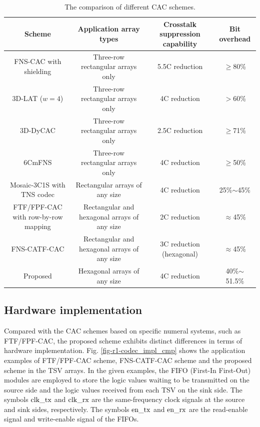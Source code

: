 \documentclass[lettersize,journal]{IEEEtran}
\begin{document}
\begin{table}
	\renewcommand{\arraystretch}{1.1}
	\caption{The comparison of different CAC schemes.}
	\label{table-6.2.1}
	\centering
	
	\begin{tabular}{|c|c|c|c|}
		\hline
		{\bf Scheme} & {\bf Application array types} & {\bf Crosstalk suppression capability} & {\bf Bit overhead} \\
		\hline
		FNS-CAC with shielding\cite{A20_Ran_7588317}
 & Three-row rectangular arrays only & 5.5C reduction & $\geq$80\% \\
		\hline
		3D-LAT ($w=4$) \cite{A19_Zou_6742982}
 & Three-row rectangular arrays only & 4C reduction & $>$60\% \\
		\hline
		3D-DyCAC \cite{A30_Shirmohammadi_8167468} & Three-row rectangular arrays only & 2.5C reduction & $\geq$71\% \\
		\hline
		6CmFNS \cite{A10_Cui_7851080}
 & Three-row rectangular arrays only & 4C reduction & $\geq$50\% \\
		\hline
		Mosaic-3C1S with TNS codec \cite{A11_Cui_9509749}
 & Rectangular arrays of any size & 4C reduction & 25\%$\sim$45\% \\
		\hline
		FTF/FPF-CAC with row-by-row mapping \cite{A31_Duan_4773140,A32_Duan_4555963}
 & Rectangular and hexagonal arrays of any size & 2C reduction & $\approx$45\% \\
 	    \hline
 FNS-CATF-CAC \cite{FNSCATF_10945736}
 & Rectangular and hexagonal arrays of any size & 3C reduction (hexagonal) & $\approx$45\% \\
		\hline
		Proposed & Hexagonal arrays of any size & 4C reduction & 40\%$\sim$51.5\% \\
		\hline
	\end{tabular}
	
\end{table}

\subsection{Hardware implementation}\label{subsec-simu-hardware}
Compared with the CAC schemes based on specific numeral systems, such as FTF/FPF-CAC, the proposed scheme exhibits distinct differences in terms of hardware implementation. Fig. \ref{fig-r1-codec_impl_cmp} shows the application examples of FTF/FPF-CAC scheme, FNS-CATF-CAC scheme and the proposed scheme in the TSV arrays. In the given examples, the FIFO (First-In First-Out) modules are employed to store the logic values waiting to be transmitted on the source side and the logic values received from each TSV on the sink side. The symbols $\rm clk\_tx$ and $\rm clk\_rx$ are the same-frequency clock signals at the source and sink sides, respectively. The symbols $\rm en\_tx$ and $\rm en\_rx$ are the read-enable signal and write-enable signal of the FIFOs.
\end{document}
